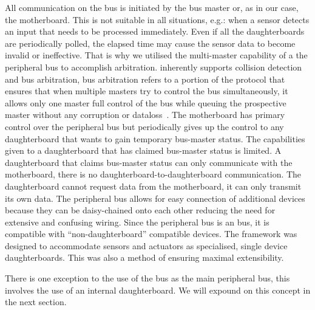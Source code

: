 	All communication on the \iic bus is initiated by the bus master or, as in our case, the motherboard. This is not suitable in all situations, e.g.: when a sensor detects an input that needs to be processed immediately. Even if all the daughterboards are periodically polled, the elapsed time may cause the sensor data to become invalid or ineffective. That is why we utilised the multi-master capability of a the \iic peripheral bus to accomplish arbitration. \iic inherently supports collision detection and bus arbitration, bus arbitration refers to a portion of the protocol that ensures that when multiple masters try to control the bus simultaneously, it allows only one master full control of the bus while queuing the prospective master without any corruption or dataloss~\parencite{nxpi2c}. The motherboard has primary control over the peripheral bus but periodically gives up the control to any daughterboard that wants to gain temporary bus-master status. The capabilities given to a daughterboard that has claimed bus-master status is limited. A daughterboard that claims bus-master status can only communicate with the motherboard, there is no daughterboard-to-daughterboard communication. The daughterboard cannot request data from the motherboard, it can only transmit its own data.
	The peripheral bus allows for easy connection of additional devices because they can be daisy-chained onto each other reducing the need for extensive and confusing wiring. Since the peripheral bus is an \iic bus, it is compatible with ``non-daughterboard'' \iic compatible devices. The framework was designed to accommodate sensors and actuators as specialised, single device daughterboards. This was also a method of ensuring maximal extensibility.
	
	There is one exception to the use of the \iic bus as the main peripheral bus, this involves the use of an internal daughterboard. We will expound on this concept in the next section.
	
